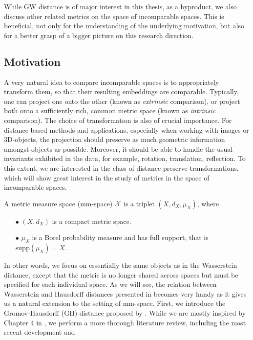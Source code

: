 While GW distance is of major interest in this thesis, as a byproduct,
we also discuss other related metrics on the space of incomparable spaces.
This is beneficial, not only for the understanding of the underlying motivation,
but also for a better grasp of a bigger picture on this research direction.

\subsection{Motivation}

A very natural idea to compare incomparable spaces is to appropriately transform them, so that
their resulting embeddings are comparable. Typically, one can project one onto the other
(known as \textit{extrinsic} comparison), or project both onto a sufficiently rich, common
metric space (known as \textit{intrinsic} comparison).
The choice of transformation is also of crucial importance.
For distance-based methods and applications, especially when working with images or
$3$D-objects, the projection should preserve as much geometric information amongst objects as possible.
Moreover, it should be able to handle the usual invariants exhibited in the data,
for example, rotation, translation, reflection. To this extent, we are interested in the class of
distance-preserve transformations, which will show great interest in the study of metrics
in the space of incomparable spaces.
\begin{definition}
A metric measure space (mm-space) $\mathcal X$ is a triplet $(X, d_X, \mu_X)$, where
\begin{itemize}
  \item[$\bullet$] $(X, d_X)$ is a compact metric space.
  \item[$\bullet$] $\mu_X$ is a Borel probability measure and has full support,
  that is $\text{supp}(\mu_X) = X$.
\end{itemize}
\end{definition}
In other words, we focus on essentially the same objects as in the Wasserstein distance, except that
the metric is no longer shared across spaces but must be specified for each individual space.
As we will see, the relation between Wasserstein and Hausdorff distances presented
in  becomes very handy as it gives us a natural extension to
the setting of mm-space. First, we introduce the Gromov-Hausdorff (GH) distance proposed
by \citet{Gromov81}. While we are mostly inspired by Chapter 4 in \citep{Memoli11},
we perform a more thorough literature review, including the most recent development and
